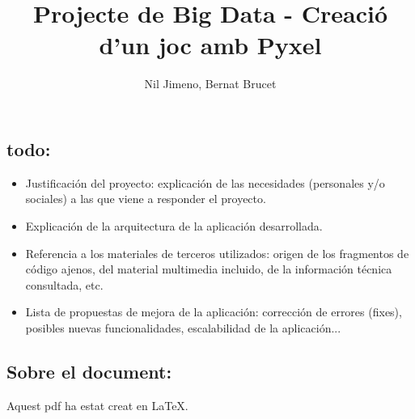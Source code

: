 

\title{Projecte de Big Data - Creaci\'o d'un joc amb Pyxel}
\author{Nil Jimeno, Bernat Brucet}


\maketitle

\subsection*{todo:}
\begin{itemize}
	\item{Justificación del proyecto: explicación de las necesidades (personales y/o
		sociales) a las que viene a responder el proyecto.}
	\item{Explicación de la arquitectura de la aplicación desarrollada.}
	\item{Referencia a los materiales de terceros utilizados: origen de los fragmentos de
		código ajenos, del material multimedia incluido, de la información técnica
		consultada, etc.}
	\item{Lista de propuestas de mejora de la aplicación: corrección de errores (fixes),
		posibles nuevas funcionalidades, escalabilidad de la aplicación...}
\end{itemize}

\subsection*{Sobre el document:}

Aquest pdf ha estat creat en \LaTeX.









